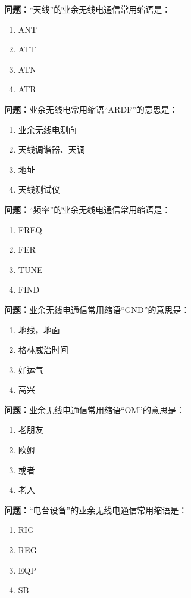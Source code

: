 \documentclass[UTF8]{ctexbook}
\begin{document}
\textbf{问题：}“天线”的业余无线电通信常用缩语是：
\begin{enumerate}[label=\Alph*), leftmargin=3em]
  \item ANT
  \item ATT
  \item ATN
  \item ATR
\end{enumerate}

\textbf{问题：}业余无线电常用缩语“ARDF”的意思是：
\begin{enumerate}[label=\Alph*), leftmargin=3em]
  \item 业余无线电测向
  \item 天线调谐器、天调
  \item 地址
  \item 天线测试仪
\end{enumerate}

\textbf{问题：}“频率”的业余无线电通信常用缩语是：
\begin{enumerate}[label=\Alph*), leftmargin=3em]
  \item FREQ
  \item FER
  \item TUNE
  \item FIND
\end{enumerate}

\textbf{问题：}业余无线电通信常用缩语“GND”的意思是：
\begin{enumerate}[label=\Alph*), leftmargin=3em]
  \item 地线，地面
  \item 格林威治时间
  \item 好运气
  \item 高兴
\end{enumerate}

\textbf{问题：}业余无线电通信常用缩语“OM”的意思是：
\begin{enumerate}[label=\Alph*), leftmargin=3em]
  \item 老朋友
  \item 欧姆
  \item 或者
  \item 老人
\end{enumerate}

\textbf{问题：}“电台设备”的业余无线电通信常用缩语是：
\begin{enumerate}[label=\Alph*), leftmargin=3em]
  \item RIG
  \item REG
  \item EQP
  \item SB
\end{enumerate}
\end{document}
